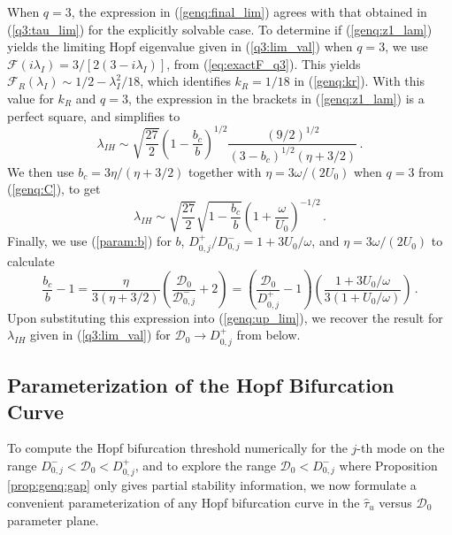 \documentclass{article}%
\newcommand{\dzjp}{D^{+}_{0,j}}
\newcommand{\dzjm}{D^{-}_{0,j}}
\begin{document}
When $q=3$, the expression in (\ref{genq:final_lim}) agrees with that
obtained in (\ref{q3:tau_lim}) for the explicitly solvable case.  To
determine if (\ref{genq:z1_lam}) yields the limiting Hopf eigenvalue
given in (\ref{q3:lim_val}) when $q=3$, we use ${\mathcal
  F}(i\lambda_I)={3/\left[2(3-i\lambda_I)\right]}$, from
(\ref{eq:exactF_q3}). This yields ${\mathcal F}_R(\lambda_I)\sim
{1/2}-{\lambda_I^2/18}$, which identifies $k_R={1/18}$ in
(\ref{genq:kr}). With this value for $k_R$ and $q=3$, the expression
in the brackets in (\ref{genq:z1_lam}) is a perfect square, and
simplifies to
\begin{equation*}
\lambda_{IH} \sim \sqrt{\frac{27}{2}} \left( 1-\frac{b_c}{b} \right)^{1/2}
 \frac{\left(9/2\right)^{1/2}}{(3-b_c)^{1/2} (\eta+{3/2})} \,.
\end{equation*}
We then use $b_c={3\eta/(\eta+{3/2})}$ together with
$\eta={3\omega/(2U_0)}$ when $q=3$ from (\ref{genq:C}), to get
\begin{equation}\label{genq:up_lim}
\lambda_{IH} \sim \sqrt{\frac{27}{2}} \sqrt{ 1-\frac{b_c}{b}} 
 \left( 1 + \frac{\omega}{U_0}\right)^{-1/2} \,.
\end{equation}
Finally, we use (\ref{param:b}) for $b$,
${D^{+}_{0,j}/D^{-}_{0,j}}=1+3{U_0/\omega}$, and
$\eta={3\omega/(2U_0)}$ to calculate
\begin{equation}
  \frac{b_c}{b}-1 = \frac{\eta}{3(\eta+{3/2})}\left( \frac{{\mathcal D}_0}
   {{\mathcal D}^{-}_{0,j}}+2\right) = \left(\frac{{\mathcal D}_0} {
   D^{+}_{0,j}} -1\right) \left(\frac{ {1+3U_0/\omega}}{3\left(1+ 
{U_0/\omega}\right)}\right) \,.
\end{equation}
Upon substituting this expression into (\ref{genq:up_lim}), we recover
the result for $\lambda_{IH}$ given in (\ref{q3:lim_val}) for
${\mathcal D}_0\to D^{+}_{0,j}$ from below.

\subsection{Parameterization of the Hopf Bifurcation Curve}\label{genq:param}

To compute the Hopf bifurcation threshold numerically for the $j$-th
mode on the range $\dzjm<{\mathcal D}_0<\dzjp$, and to explore the
range ${\mathcal D}_0<\dzjm$ where Proposition \ref{prop:genq:gap} only gives
partial stability information, we now formulate a convenient
parameterization of any Hopf bifurcation curve in the $\hat{\tau}_u$
versus ${\mathcal D}_0$ parameter plane.
\end{document}
